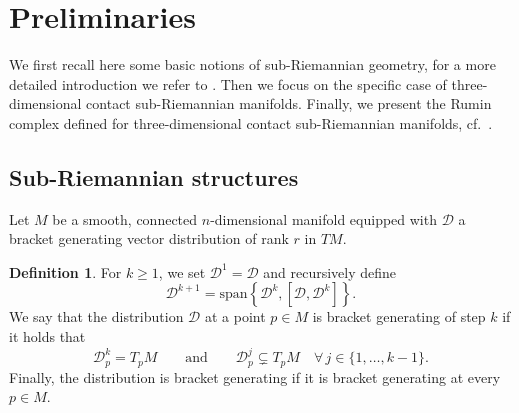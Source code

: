 \documentclass{amsart}
\theoremstyle{plain}
\theoremstyle{definition}
\newtheorem{definition}[thm]{Definition}
\theoremstyle{remark}
\newcommand{\sr}{sub-{R}ie\-man\-nian }
\newcommand{\distr}{\mathcal{D}}								%
\begin{document}
%

\section{Preliminaries} \label{s:prel}

We first recall here some basic notions of \sr geometry, for a more detailed introduction we refer to \cite{thebook}.
Then we focus on the specific case of three-dimensional contact \sr manifolds.
Finally, we present the Rumin complex defined for three-dimensional contact \sr manifolds, cf.\ \cite{RuminContact}.

\subsection{Sub-{R}iemannian structures}
Let $M$ be a smooth, connected $n$-dimensional manifold equipped with $\distr$ a bracket generating vector distribution of rank $r$ in $TM$.



\begin{definition}
\label{def:bracketgenerating}
For $k\geq 1$,  we set $\distr^1=\distr$ and recursively define
\begin{equation}
\distr ^{k+1} = \mathrm{span} \left\{\distr^{k},\left[\distr,\distr^k \right]\right\}.
\end{equation}
We say that the distribution $\distr$ at a point $p\in M$ is bracket generating of step $k$ if it holds that
\begin{equation}
\distr ^{k}_p =T_p M 
\qquad \mbox{and} \qquad
\distr ^{j}_p \subsetneq T_p M \quad \forall\, j\in\{1,\ldots,k-1\}.
\end{equation}
Finally, the distribution is bracket generating if it is bracket generating at every $p\in M$.
\end{definition}
\end{document}

